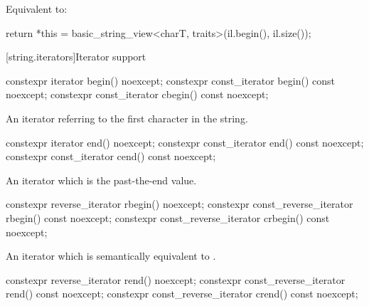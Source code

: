 \begin{itemdescr}
\pnum
\effects
Equivalent to:
\begin{codeblock}
return *this = basic_string_view<charT, traits>(il.begin(), il.size());
\end{codeblock}
\end{itemdescr}

[string.iterators]{Iterator support}

%
%
\begin{itemdecl}
constexpr iterator       begin() noexcept;
constexpr const_iterator begin() const noexcept;
constexpr const_iterator cbegin() const noexcept;
\end{itemdecl}

\begin{itemdescr}
\pnum
\returns
An iterator referring to the first character in the string.
\end{itemdescr}

%
%
\begin{itemdecl}
constexpr iterator       end() noexcept;
constexpr const_iterator end() const noexcept;
constexpr const_iterator cend() const noexcept;
\end{itemdecl}

\begin{itemdescr}
\pnum
\returns
An iterator which is the past-the-end value.
\end{itemdescr}

%
%
\begin{itemdecl}
constexpr reverse_iterator       rbegin() noexcept;
constexpr const_reverse_iterator rbegin() const noexcept;
constexpr const_reverse_iterator crbegin() const noexcept;
\end{itemdecl}

\begin{itemdescr}
\pnum
\returns
An iterator which is semantically equivalent to
.
\end{itemdescr}

%
%
\begin{itemdecl}
constexpr reverse_iterator       rend() noexcept;
constexpr const_reverse_iterator rend() const noexcept;
constexpr const_reverse_iterator crend() const noexcept;
\end{itemdecl}

